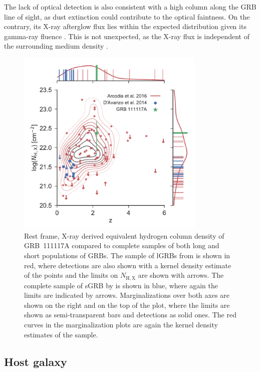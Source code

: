 \documentclass{aa}    %
\begin{document}
The lack of optical detection is also consistent with a high column along the
GRB line of sight, as dust extinction could contribute to the optical faintness.
On the contrary, its X-ray afterglow flux lies within the expected distribution
given its gamma-ray fluence \citep{DAvanzo2014a}. This is not unexpected, as the
X-ray flux is independent of the surrounding medium density \citep{Freedman2001,
	Berger2003, Nysewander2009}.

\begin{figure}
	\centering \includegraphics[width=9cm]{figures/NH_z.pdf} \caption{Rest frame,
	X-ray derived equivalent hydrogen column density of GRB~111117A compared to
	complete samples of both long and short populations of GRBs. The sample of
	lGRBs from \citet{Arcodia2016} is shown in red, where detections are also shown
	with a kernel density estimate of the points and the limits on $N_\mathrm{H,X}$
	are shown with arrows. The complete sample of sGRB by \citet{DAvanzo2014a} is
	shown in blue, where again the limits are indicated by arrows. Marginalizations
	over both axes are shown on the right and on the top of the plot, where the
	limits are shown as semi-transparent bars and detections as solid ones. The red
	curves in the marginalization plots are again the kernel density estimates of
	the \citet{Arcodia2016} sample.} \label{fig:NH_z}
\end{figure}


\subsection{Host galaxy}
\end{document}
